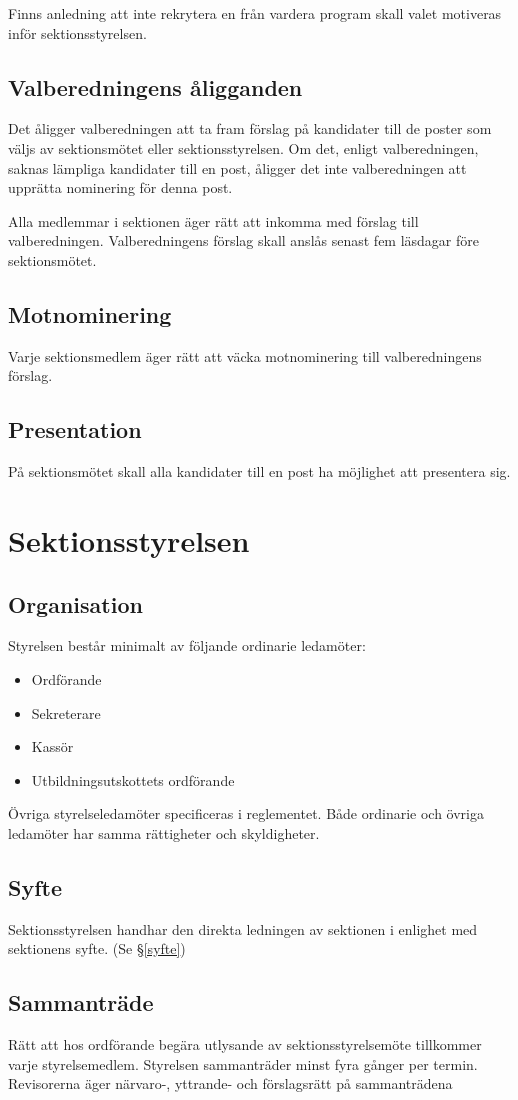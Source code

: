 \documentclass{datateknologsektionen-document}
\begin{document}
Finns anledning att inte rekrytera en från vardera program skall valet motiveras inför sektionsstyrelsen.

\subsection{Valberedningens åligganden}
Det åligger valberedningen att ta fram förslag på kandidater till de poster som väljs av
sektionsmötet eller sektionsstyrelsen. Om det, enligt valberedningen, saknas lämpliga
kandidater till en post, åligger det inte valberedningen att upprätta nominering för denna
post.

Alla medlemmar i sektionen äger rätt att inkomma med förslag till valberedningen.
Valberedningens förslag skall anslås senast fem läsdagar före sektionsmötet.
\subsection{Motnominering}
Varje sektionsmedlem äger rätt att väcka motnominering till valberedningens förslag.
\subsection{Presentation}
På sektionsmötet skall alla kandidater till en post ha möjlighet att presentera sig.
\section{Sektionsstyrelsen}
\subsection{Organisation}
Styrelsen består minimalt av följande ordinarie ledamöter:
\begin{itemize}
  \item Ordförande
  \item Sekreterare
  \item Kassör
  \item Utbildningsutskottets ordförande
\end{itemize}
Övriga styrelseledamöter specificeras i reglementet. Både ordinarie och övriga ledamöter
har samma rättigheter och skyldigheter.
\subsection{Syfte}
Sektionsstyrelsen handhar den direkta ledningen av sektionen i enlighet med sektionens
syfte. (Se \S \ref{syfte})
\subsection{Sammanträde}
\label{sektionsstyrelsensammantrade}
Rätt att hos ordförande begära utlysande av sektionsstyrelsemöte tillkommer varje
styrelsemedlem. Styrelsen sammanträder minst fyra gånger per termin. Revisorerna äger
närvaro-, yttrande- och förslagsrätt på sammanträdena
\end{document}
